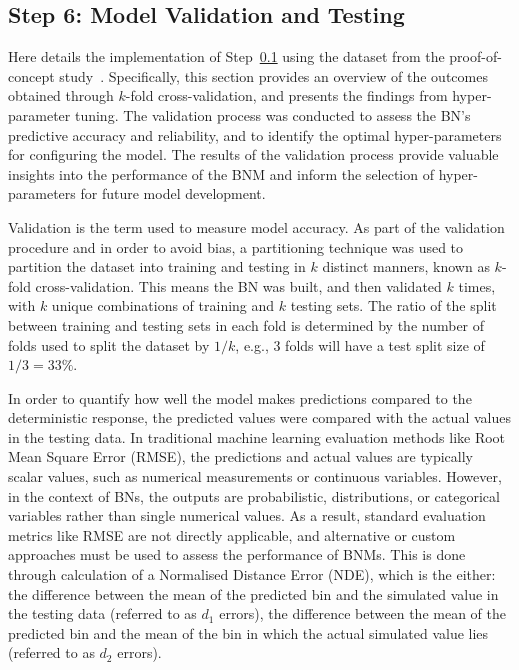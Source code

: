 \documentclass[journal]{IEEEtran}
\begin{document}
\subsection{\textbf{Step 6}: Model Validation and Testing}\label{sec:meth_validation} 

Here details the implementation of Step~\ref{sec:meth_validation} using the dataset from the proof-of-concept study~\cite{Griffiths2024}. Specifically, this section provides an overview of the outcomes obtained through $k$-fold cross-validation, and presents the findings from hyper-parameter tuning. The validation process was conducted to assess the BN's predictive accuracy and reliability, and to identify the optimal hyper-parameters for configuring the model. The results of the validation process provide valuable insights into the performance of the BNM and inform the selection of hyper-parameters for future model development.

Validation is the term used to measure model accuracy. As part of the validation procedure and in order to avoid bias, a partitioning technique was used to partition the dataset into training and testing in $k$ distinct manners, known as $k$-fold cross-validation. This means the BN was built, and then validated $k$ times, with $k$ unique combinations of training and $k$ testing sets. The ratio of the split between training and testing sets in each fold is determined by the number of folds used to split the dataset by $1/k$, e.g., 3 folds will have a test split size of $1/3 = 33\%$. 

In order to quantify how well the model makes predictions compared to the deterministic response, the predicted values were compared with the actual values in the testing data. In traditional machine learning evaluation methods like Root Mean Square Error (RMSE), the predictions and actual values are typically scalar values, such as numerical measurements or continuous variables. However, in the context of BNs, the outputs are probabilistic, distributions, or categorical variables rather than single numerical values. As a result, standard evaluation metrics like RMSE are not directly applicable, and alternative or custom approaches must be used to assess the performance of BNMs. This is done through calculation of a Normalised Distance Error (NDE), which is the either: the difference between the mean of the predicted bin and the simulated value in the testing data (referred to as $d_{1}$ errors), the difference between the mean of the predicted bin and the mean of the bin in which the actual simulated value lies (referred to as $d_{2}$ errors).
\end{document}
